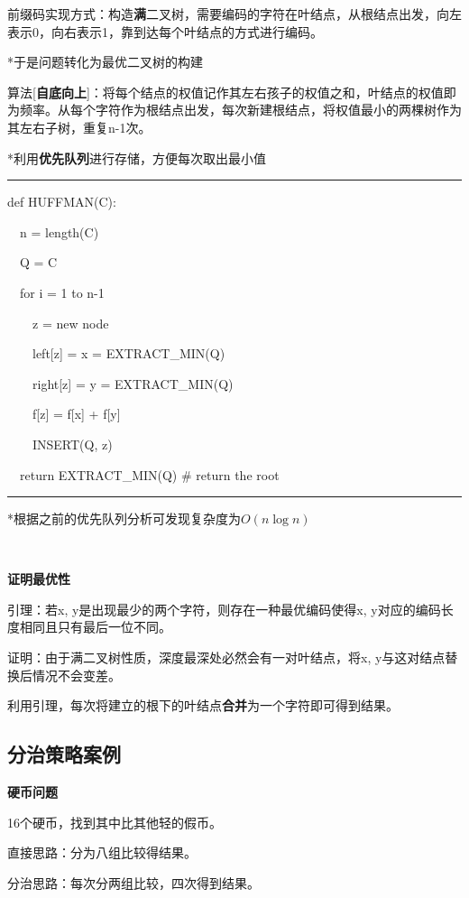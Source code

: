 \documentclass[a4paper,UTF8,fontset=windows]{ctexart}
\newenvironment{code}{\rule{36em}{0.1em}\setlength{\parindent}{1em}

}{

\setlength{\parindent}{0em}\rule{36em}{0.1em}}
\begin{document}
前缀码实现方式：构造\textbf{满}二叉树，需要编码的字符在叶结点，从根结点出发，向左表示0，向右表示1，靠到达每个叶结点的方式进行编码。

*\hspace{0em}于是问题转化为最优二叉树的构建

算法[\textbf{自底向上}]：将每个结点的权值记作其左右孩子的权值之和，叶结点的权值即为频率。从每个字符作为根结点出发，每次新建根结点，将权值最小的两棵树作为其左右子树，重复n-1次。

*\hspace{0em}利用\textbf{优先队列}进行存储，方便每次取出最小值

\begin{code}
def HUFFMAN(C):

\ \ n = length(C)

\ \ Q = C

\ \ for i = 1 to n-1

\ \ \ \ z = new node

\ \ \ \ left[z] = x = EXTRACT\_MIN(Q)

\ \ \ \ right[z] = y = EXTRACT\_MIN(Q)

\ \ \ \ f[z] = f[x] + f[y]

\ \ \ \ INSERT(Q, z)

\ \ return EXTRACT\_MIN(Q) \# return the root

\end{code}

*\hspace{0em}根据之前的优先队列分析可发现复杂度为$O(n\log n)$

\

\textbf{证明最优性}

引理：若x, y是出现最少的两个字符，则存在一种最优编码使得x, y对应的编码长度相同且只有最后一位不同。

证明：由于满二叉树性质，深度最深处必然会有一对叶结点，将x, y与这对结点替换后情况不会变差。

利用引理，每次将建立的根下的叶结点\textbf{合并}为一个字符即可得到结果。

\subsection{分治策略案例}

\textbf{硬币问题}

16个硬币，找到其中比其他轻的假币。

直接思路：分为八组比较得结果。

分治思路：每次分两组比较，四次得到结果。
\end{document}
